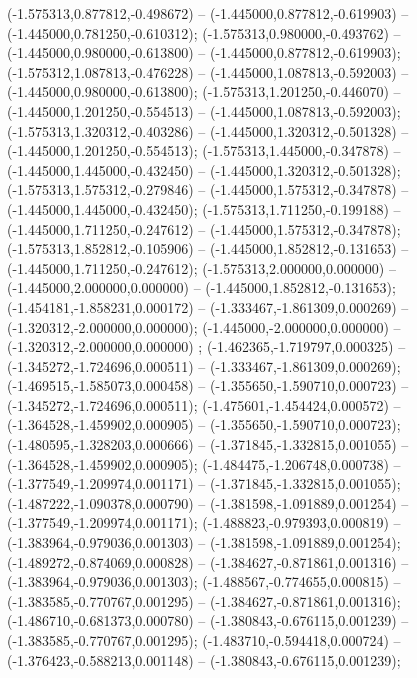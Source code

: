  (-1.575313,0.877812,-0.498672) -- (-1.445000,0.877812,-0.619903) -- (-1.445000,0.781250,-0.610312);
 (-1.575313,0.980000,-0.493762) -- (-1.445000,0.980000,-0.613800) -- (-1.445000,0.877812,-0.619903);
 (-1.575312,1.087813,-0.476228) -- (-1.445000,1.087813,-0.592003) -- (-1.445000,0.980000,-0.613800);
 (-1.575313,1.201250,-0.446070) -- (-1.445000,1.201250,-0.554513) -- (-1.445000,1.087813,-0.592003);
 (-1.575313,1.320312,-0.403286) -- (-1.445000,1.320312,-0.501328) -- (-1.445000,1.201250,-0.554513);
 (-1.575313,1.445000,-0.347878) -- (-1.445000,1.445000,-0.432450) -- (-1.445000,1.320312,-0.501328);
 (-1.575313,1.575312,-0.279846) -- (-1.445000,1.575312,-0.347878) -- (-1.445000,1.445000,-0.432450);
 (-1.575313,1.711250,-0.199188) -- (-1.445000,1.711250,-0.247612) -- (-1.445000,1.575312,-0.347878);
 (-1.575313,1.852812,-0.105906) -- (-1.445000,1.852812,-0.131653) -- (-1.445000,1.711250,-0.247612);
 (-1.575313,2.000000,0.000000) -- (-1.445000,2.000000,0.000000) -- (-1.445000,1.852812,-0.131653);
 (-1.454181,-1.858231,0.000172) -- (-1.333467,-1.861309,0.000269) -- (-1.320312,-2.000000,0.000000);
 (-1.445000,-2.000000,0.000000) -- (-1.320312,-2.000000,0.000000) ;
 (-1.462365,-1.719797,0.000325) -- (-1.345272,-1.724696,0.000511) -- (-1.333467,-1.861309,0.000269);
 (-1.469515,-1.585073,0.000458) -- (-1.355650,-1.590710,0.000723) -- (-1.345272,-1.724696,0.000511);
 (-1.475601,-1.454424,0.000572) -- (-1.364528,-1.459902,0.000905) -- (-1.355650,-1.590710,0.000723);
 (-1.480595,-1.328203,0.000666) -- (-1.371845,-1.332815,0.001055) -- (-1.364528,-1.459902,0.000905);
 (-1.484475,-1.206748,0.000738) -- (-1.377549,-1.209974,0.001171) -- (-1.371845,-1.332815,0.001055);
 (-1.487222,-1.090378,0.000790) -- (-1.381598,-1.091889,0.001254) -- (-1.377549,-1.209974,0.001171);
 (-1.488823,-0.979393,0.000819) -- (-1.383964,-0.979036,0.001303) -- (-1.381598,-1.091889,0.001254);
 (-1.489272,-0.874069,0.000828) -- (-1.384627,-0.871861,0.001316) -- (-1.383964,-0.979036,0.001303);
 (-1.488567,-0.774655,0.000815) -- (-1.383585,-0.770767,0.001295) -- (-1.384627,-0.871861,0.001316);
 (-1.486710,-0.681373,0.000780) -- (-1.380843,-0.676115,0.001239) -- (-1.383585,-0.770767,0.001295);
 (-1.483710,-0.594418,0.000724) -- (-1.376423,-0.588213,0.001148) -- (-1.380843,-0.676115,0.001239);
